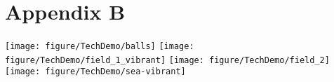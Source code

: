 \chapter{Appendix B}
\texttt{[image: figure/TechDemo/balls]}
\texttt{[image: figure/TechDemo/field\_1\_vibrant]}
\texttt{[image: figure/TechDemo/field\_2]}
\texttt{[image: figure/TechDemo/sea-vibrant]}